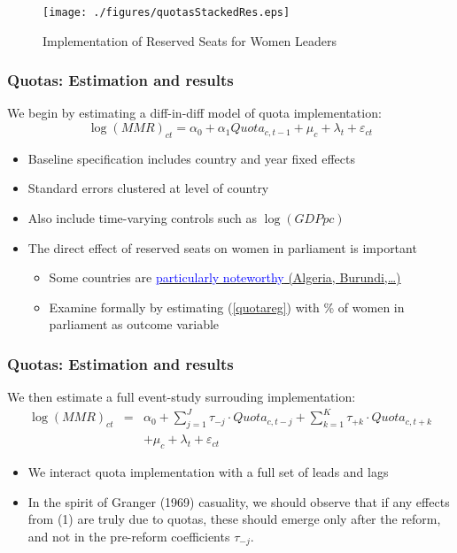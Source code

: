 \documentclass[10pt,letterpaper,subeqn]{beamer}
\begin{document}
\begin{frame}[label=quotaDesc]
  \begin{figure}
    \caption{Implementation of Reserved Seats for Women Leaders}
    \texttt{[image: ./figures/quotasStackedRes.eps]}
  \end{figure}
\end{frame}


\begin{frame}[label=Quotas]
\frametitle{Quotas: Estimation and results}
We begin by estimating a diff-in-diff model of quota implementation:
\begin{equation}
  \label{quotareg}
\log(MMR)_{ct} = \alpha_0 + \alpha_1 Quota_{c,t-1} + \mu_c + \lambda_t + \varepsilon_{ct}  
\end{equation}
\vspace{4mm}
\begin{itemize}
\item Baseline specification includes country and year fixed effects
\item Standard errors clustered at level of country
\item Also include time-varying controls such as $\log(GDP pc)$
\item The direct effect of reserved seats on women in parliament is important
  \begin{itemize}
    \item Some countries are \hyperlink{quotaCover}{{\textcolor{blue}{particularly noteworthy} (Algeria, Burundi,\ldots)}} 
  \item Examine formally by estimating (\ref{quotareg}) with \% of women in parliament as outcome variable
  \end{itemize}
  \end{itemize}
\end{frame}

\begin{frame}[label=Quotas2]
\frametitle{Quotas: Estimation and results}
We then estimate a full event-study surrouding implementation:
\begin{eqnarray}
  \log(MMR)_{ct} &=& \alpha_0 + \sum_{j=1}^J \tau_{-j}\cdot Quota_{c,t-j} + \sum_{k=1}^K \tau_{+k}\cdot Quota_{c,t+k} \nonumber \\
  && + \mu_c + \lambda_t + \varepsilon_{ct} \nonumber
\end{eqnarray}
\begin{itemize}
\item We interact quota implementation with a full set of leads and lags
\item In the spirit of Granger (1969) casuality, we should observe that if any effects from (1) are truly due to quotas, these should emerge only after the reform, and not in the pre-reform coefficients $\tau_{-j}.$
\end{itemize}
\end{frame}
\end{document}
